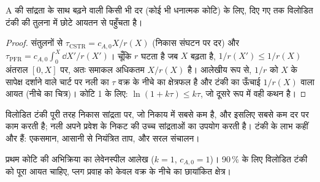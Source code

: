 \begin{proposition}[टंकी या नली]\label{prop:b2:continuous-reactors:compare}
A की सांद्रता के साथ बढ़ने वाली किसी भी दर (कोई भी धनात्मक
कोटि) के लिए,  दिए गए  तक विलोडित टंकी की तुलना में
छोटे आयतन से पहुँचता है।
\end{proposition}

\begin{proof}
संतुलनों से $\tau_{\text{CSTR}} = c_{A,0}X/r(X)$ (निकास
संघटन पर दर) और $\tau_{\text{PFR}} = c_{A,0}\int_0^X\dd X'/r(X')$। चूँकि $r$
घटता है जब $X$ बढ़ता है, $1/r(X') \leq 1/r(X)$ अंतराल $[0, X]$ पर, अतः
समाकल अधिकतम $X/r(X)$ है। आलेखीय रूप से, $1/r$ को $X$ के सापेक्ष दर्शाने वाले चार्ट पर
नली का $\tau$ वक्र के नीचे का क्षेत्रफल है और टंकी का 
ऊँचाई $1/r(X)$ वाला आयत (नीचे का चित्र)। कोटि 1 के लिए: $\ln(1 + k\tau) \leq k\tau$, जो
दूसरे रूप में वही कथन है।
\end{proof}

विलोडित टंकी पूरी तरह निकास सांद्रता पर, जो निकाय में सबसे कम है,
और इसलिए सबसे कम दर पर काम करती है; नली अपने प्रवेश के निकट की उच्च
सांद्रताओं का उपयोग करती है। टंकी के लाभ कहीं और हैं: एकसमान, आसानी से
नियंत्रित ताप, और सरल संचालन।

\begin{omfigure}

{\small प्रथम कोटि की अभिक्रिया का लेवेनस्पील आलेख ($k = 1$, $c_{A,0} = 1$)।
90\,\%  के लिए विलोडित टंकी को पूरा आयत चाहिए, प्लग
प्रवाह को केवल वक्र के नीचे का छायांकित क्षेत्र।}
\end{omfigure}

